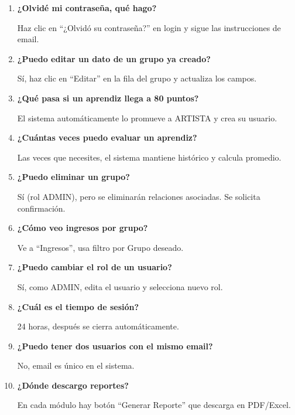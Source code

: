 \documentclass[12pt,a4paper,spanish,oneside]{report}
\begin{document}
\begin{enumerate}
    \item \textbf{¿Olvidé mi contraseña, qué hago?}
    
    Haz clic en ``¿Olvidó su contraseña?'' en login y sigue las instrucciones de email.
    
    \item \textbf{¿Puedo editar un dato de un grupo ya creado?}
    
    Sí, haz clic en ``Editar'' en la fila del grupo y actualiza los campos.
    
    \item \textbf{¿Qué pasa si un aprendiz llega a 80 puntos?}
    
    El sistema automáticamente lo promueve a ARTISTA y crea su usuario.
    
    \item \textbf{¿Cuántas veces puedo evaluar un aprendiz?}
    
    Las veces que necesites, el sistema mantiene histórico y calcula promedio.
    
    \item \textbf{¿Puedo eliminar un grupo?}
    
    Sí (rol ADMIN), pero se eliminarán relaciones asociadas. Se solicita confirmación.
    
    \item \textbf{¿Cómo veo ingresos por grupo?}
    
    Ve a ``Ingresos'', usa filtro por Grupo deseado.
    
    \item \textbf{¿Puedo cambiar el rol de un usuario?}
    
    Sí, como ADMIN, edita el usuario y selecciona nuevo rol.
    
    \item \textbf{¿Cuál es el tiempo de sesión?}
    
    24 horas, después se cierra automáticamente.
    
    \item \textbf{¿Puedo tener dos usuarios con el mismo email?}
    
    No, email es único en el sistema.
    
    \item \textbf{¿Dónde descargo reportes?}
    
    En cada módulo hay botón ``Generar Reporte'' que descarga en PDF/Excel.
\end{enumerate}
\end{document}
